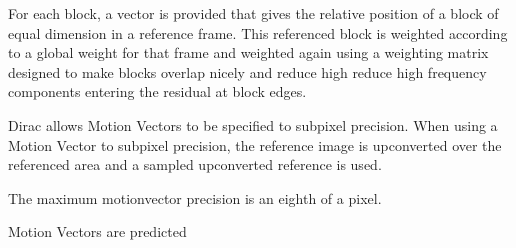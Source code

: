 
For each block, a vector is provided that gives the relative position of
a block of equal dimension in a reference frame.  This referenced block
is weighted according to a global weight for that frame and weighted
again using a weighting matrix designed to make blocks overlap nicely
and reduce high reduce high frequency components entering the residual
at block edges.

Dirac allows Motion Vectors to be specified to subpixel precision.  When
using a Motion Vector to subpixel precision, the reference image is
upconverted over the referenced area and a sampled upconverted reference
is used.

The maximum motionvector precision is an eighth of a pixel.

Motion Vectors are predicted

